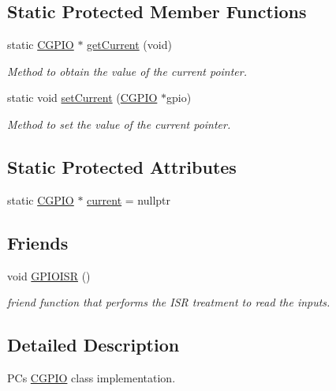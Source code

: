 \subsection*{Static Protected Member Functions}
\begin{DoxyCompactItemize}
\item 
static \mbox{\hyperlink{class_c_g_p_i_o}{C\+G\+P\+IO}} $\ast$ \mbox{\hyperlink{class_c_g_p_i_o_a5fda50ad2bf1efc087793542ee3c88af}{get\+Current}} (void)
\begin{DoxyCompactList}\small\item\em Method to obtain the value of the current pointer. \end{DoxyCompactList}\item 
static void \mbox{\hyperlink{class_c_g_p_i_o_a06bc11242ea8f85b5d71419bf70ef674}{set\+Current}} (\mbox{\hyperlink{class_c_g_p_i_o}{C\+G\+P\+IO}} $\ast$gpio)
\begin{DoxyCompactList}\small\item\em Method to set the value of the current pointer. \end{DoxyCompactList}\end{DoxyCompactItemize}
\subsection*{Static Protected Attributes}
\begin{DoxyCompactItemize}
\item 
static \mbox{\hyperlink{class_c_g_p_i_o}{C\+G\+P\+IO}} $\ast$ \mbox{\hyperlink{class_c_g_p_i_o_a21d3b21fbb921eca646b24582fb5c43f}{current}} = nullptr
\end{DoxyCompactItemize}
\subsection*{Friends}
\begin{DoxyCompactItemize}
\item 
void \mbox{\hyperlink{class_c_g_p_i_o_a94ed9692de8f805af0517790cb06b71c}{G\+P\+I\+O\+I\+SR}} ()
\begin{DoxyCompactList}\small\item\em friend function that performs the I\+SR treatment to read the inputs. \end{DoxyCompactList}\end{DoxyCompactItemize}


\subsection{Detailed Description}
PC\textquotesingle{}s \mbox{\hyperlink{class_c_g_p_i_o}{C\+G\+P\+IO}} class implementation. 

